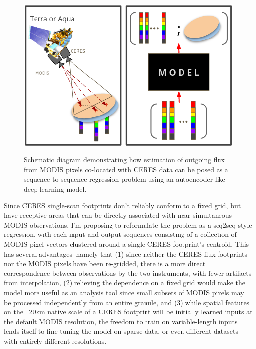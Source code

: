 \documentclass[12pt]{article}
\begin{document}
\begin{figure}
    \begin{center}
        \vspace{-2.5em}
        \includegraphics[width=.95\linewidth]{figs/schematic.png}
        \caption{Schematic diagram demonstrating how estimation of outgoing flux from MODIS pixels co-located with CERES data can be posed as a sequence-to-sequence regression problem using an autoencoder-like deep learning model.}
        \vspace{-1.5em}
        \label{schematic}
    \end{center}
\end{figure}

Since CERES single-scan footprints don't reliably conform to a fixed grid, but have receptive areas that can be directly associated with near-simultaneous MODIS observations, I'm proposing to reformulate the problem as a seq2seq-style regression, with each input and output sequences consisting of a collection of MODIS pixel vectors clustered around a single CERES footprint's centroid. This has several advantages, namely that (1) since neither the CERES flux footprints nor the MODIS pixels have been re-gridded, there is a more direct correspondence between observations by the two instruments, with fewer artifacts from interpolation, (2) relieving the dependence on a fixed grid would make the model more useful as an analysis tool since small subsets of MODIS pixels may be processed independently from an entire granule, and (3) while spatial features on the ~20km native scale of a CERES footprint will be initially learned inputs at the default MODIS resolution, the freedom to train on variable-length inputs lends itself to fine-tuning the model on sparse data, or even different datasets with entirely different resolutions.
\end{document}

